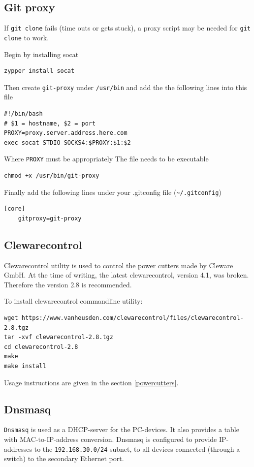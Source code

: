 \documentclass[a4paper,11pt]{article}
\newcommand{\cmd}[1]{\texttt{#1}}
\begin{document}
\subsection*{Git proxy}
\label{gitclone}
If \cmd{git clone} fails (time outs or gets stuck), a proxy script may be needed for \cmd{git clone} to work.

Begin by installing socat

\begin{lstlisting}
zypper install socat
\end{lstlisting}

Then create \cmd{git-proxy} under \cmd{/usr/bin} and add the the following lines into this file

\begin{lstlisting}
#!/bin/bash
# $1 = hostname, $2 = port
PROXY=proxy.server.address.here.com
exec socat STDIO SOCKS4:$PROXY:$1:$2
\end{lstlisting}

Where \cmd{PROXY} must be appropriately
The file needs to be executable

\begin{lstlisting}
chmod +x /usr/bin/git-proxy
\end{lstlisting}

Finally add the following lines under your .gitconfig file (\cmd{\textasciitilde/.gitconfig})

\begin{lstlisting}
[core]
	gitproxy=git-proxy
\end{lstlisting}

\subsection*{Clewarecontrol}
Clewarecontrol utility is used to control the power cutters made by Cleware GmbH. At the time of writing, the latest clewarecontrol, version 4.1, was broken. Therefore the version 2.8 is recommended.

To install clewarecontrol commandline utility:
\begin{lstlisting}
wget https://www.vanheusden.com/clewarecontrol/files/clewarecontrol-2.8.tgz
tar -xvf clewarecontrol-2.8.tgz
cd clewarecontrol-2.8
make
make install
\end{lstlisting}

Usage instructions are given in the section \ref{powercutters}.

\subsection*{Dnsmasq}
\cmd{Dnsmasq} is used as a DHCP-server for the PC-devices. It also provides a table with MAC-to-IP-address conversion. Dnsmasq is configured to provide IP-addresses to the \cmd{192.168.30.0/24} subnet, to all devices connected (through a switch) to the secondary Ethernet port.
\end{document}
